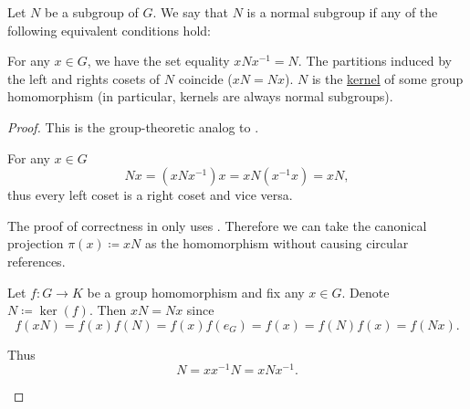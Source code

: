 \begin{Definition}\label{def:normal_subgroup}
  Let \( N \) be a subgroup of \( G \). We say that \( N \) is a normal subgroup if any of the following equivalent conditions hold:
  \begin{DefEnum}
     For any \( x \in G \), we have the set equality \( x N x^{-1} = N \).
     The partitions induced by the left and rights cosets of \( N \) coincide (\( xN = Nx \)).
     \( N \) is the \hyperref[def:unital_magma_kernel]{kernel} of some group homomorphism (in particular, kernels are always normal subgroups).
  \end{DefEnum}
\end{Definition}
\begin{proof}
  This is the group-theoretic analog to .

  \begin{RefList}
     For any \( x \in G \)
    \begin{equation*}
      Nx = (xNx^{-1})x = xN(x^{-1}x) = xN,
    \end{equation*}
    thus every left coset is a right coset and vice versa.

     The proof of correctness in  only uses . Therefore we can take the canonical projection \( \pi(x) \coloneqq xN \) as the homomorphism without causing circular references.

     Let \( f: G \to K \) be a group homomorphism and fix any \( x \in G \). Denote \( N \coloneqq \ker(f) \). Then \( xN = Nx \) since
    \begin{equation*}
      f(xN)
      =
      f(x) f(N)
      =
      f(x) f(e_G)
      =
      f(x)
      =
      f(N) f(x)
      =
      f(Nx).
    \end{equation*}

    Thus
    \begin{equation*}
      N = xx^{-1}N = xNx^{-1}.
    \end{equation*}
  \end{RefList}
\end{proof}

